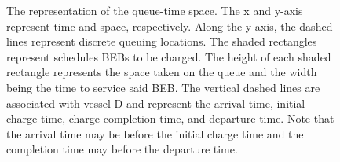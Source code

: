 \documentclass[ee,thesis]{usuthesis}
\begin{document}
\begin{figure}[ht!]
{{
  }}
  \caption{The representation of the queue-time space. The x and y-axis represent time and space, respectively. Along the y-axis, the dashed lines represent discrete queuing locations. The shaded rectangles represent schedules BEBs to be charged. The height of each shaded rectangle represents the space taken on the queue and the width being the time to service said BEB. The vertical dashed lines are associated with vessel D and represent the arrival time, initial charge time, charge completion time, and departure time. Note that the arrival time may be before the initial charge time and the completion time may before the departure time.}
  \label{fig:spacial-and-temporal-constr}
\end{figure}
\end{document}
